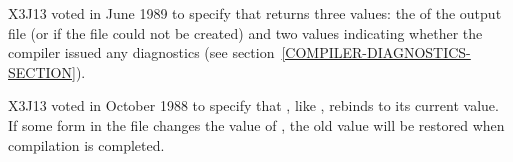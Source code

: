 \begin{newer}
X3J13 voted in June 1989  to specify that
 returns three values: the  of the output
file (or  if the file could not be created) and two values
indicating whether the compiler issued any diagnostics
(see section~\ref{COMPILER-DIAGNOSTICS-SECTION}).
\end{newer}

\begin{newer}
X3J13 voted in October 1988  to specify that
, like , rebinds  to its current value.  If
some form in the file changes the value of ,
the old value will be restored when compilation is completed.
\end{newer}


